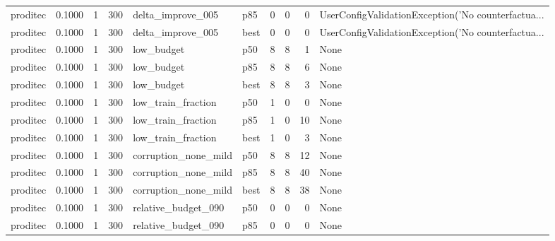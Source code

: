 \begin{tabular}{lrrrllrrrl}
proditec &    0.1000 &    1 &    300 &    delta\_improve\_005 &    p85 &               0 &          0 &       0 & UserConfigValidationException('No counterfactua... \\
proditec &    0.1000 &    1 &    300 &    delta\_improve\_005 &   best &               0 &          0 &       0 & UserConfigValidationException('No counterfactua... \\
proditec &    0.1000 &    1 &    300 &           low\_budget &    p50 &               8 &          8 &       1 &                                               None \\
proditec &    0.1000 &    1 &    300 &           low\_budget &    p85 &               8 &          8 &       6 &                                               None \\
proditec &    0.1000 &    1 &    300 &           low\_budget &   best &               8 &          8 &       3 &                                               None \\
proditec &    0.1000 &    1 &    300 &   low\_train\_fraction &    p50 &               1 &          0 &       0 &                                               None \\
proditec &    0.1000 &    1 &    300 &   low\_train\_fraction &    p85 &               1 &          0 &      10 &                                               None \\
proditec &    0.1000 &    1 &    300 &   low\_train\_fraction &   best &               1 &          0 &       3 &                                               None \\
proditec &    0.1000 &    1 &    300 & corruption\_none\_mild &    p50 &               8 &          8 &      12 &                                               None \\
proditec &    0.1000 &    1 &    300 & corruption\_none\_mild &    p85 &               8 &          8 &      40 &                                               None \\
proditec &    0.1000 &    1 &    300 & corruption\_none\_mild &   best &               8 &          8 &      38 &                                               None \\
proditec &    0.1000 &    1 &    300 &  relative\_budget\_090 &    p50 &               0 &          0 &       0 &                                               None \\
proditec &    0.1000 &    1 &    300 &  relative\_budget\_090 &    p85 &               0 &          0 &       0 &                                               None \\

\end{tabular}
